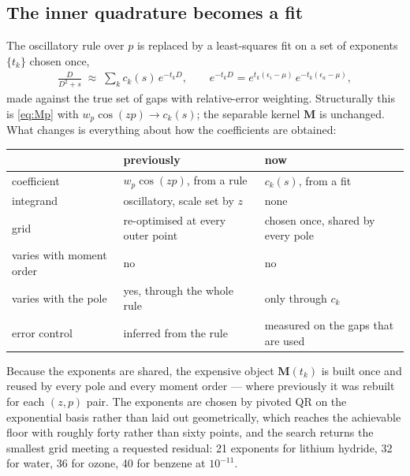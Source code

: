\documentclass[11pt]{article}
\newcommand{\mat}[1]{{\mathbf{#1}}}
\begin{document}
\subsection{The inner quadrature becomes a fit}

The oscillatory rule over $p$ is replaced by a least-squares fit on a set of exponents
$\{t_k\}$ chosen once,
\begin{align}
    \frac{D}{D^2+s} \;\approx\; \sum_k c_k(s)\, e^{-t_k D} ,
    \qquad
    e^{-t_k D} = e^{t_k(\epsilon_i - \mu)}\, e^{-t_k(\epsilon_a - \mu)} ,
    \label{eq:expfit}
\end{align}
made against the true set of gaps with relative-error weighting. Structurally this is
\eqref{eq:Mp} with $w_p \cos(z p) \to c_k(s)$; the separable kernel $\mat{M}$ is unchanged.
What changes is everything about how the coefficients are obtained:

\begin{center}
\begin{tabular}{@{}>{\raggedright\arraybackslash}p{3.2cm}>{\raggedright\arraybackslash}p{5.4cm}>{\raggedright\arraybackslash}p{5.6cm}@{}}
\toprule
& previously & now \\
\midrule
coefficient & $w_p \cos(z p)$, from a rule & $c_k(s)$, from a fit \\
integrand & oscillatory, scale set by $z$ & none \\
grid & re-optimised at every outer point & chosen once, shared by every pole \\
varies with moment order & no & no \\
varies with the pole & yes, through the whole rule & only through $c_k$ \\
error control & inferred from the rule & measured on the gaps that are used \\
\bottomrule
\end{tabular}
\end{center}

Because the exponents are shared, the expensive object $\mat{M}(t_k)$ is built once and
reused by every pole and every moment order --- where previously it was rebuilt for each
$(z, p)$ pair. The exponents are chosen by pivoted QR on the exponential basis rather than
laid out geometrically, which reaches the achievable floor with roughly forty rather than
sixty points, and the search returns the smallest grid meeting a requested residual: 21
exponents for lithium hydride, 32 for water, 36 for ozone, 40 for benzene at $10^{-11}$.
\end{document}
